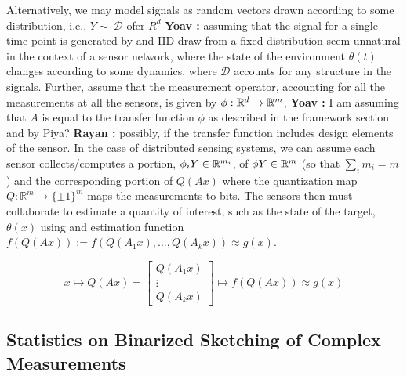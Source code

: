 \documentclass{article}
\newcommand{\comment}[3]{{\color{#1} {\bf #2 :} #3}}
\newcommand{\yoav}[1]{\comment{magenta}{Yoav}{#1}}
\newcommand{\rayan}[1]{\comment{red}{Rayan}{#1}}
\begin{document}
Alternatively, we may model signals as random vectors drawn according
to some distribution, i.e., $Y\sim~\mathcal{D}$ ofer $R^d$
\yoav{assuming that the signal for a single time point is generated by
  and IID draw from a fixed distribution seem unnatural in the context
  of a sensor network, where the state of the environment $\theta(t)$
  changes according to some dynamics.} where $\mathcal{D}$ accounts
for any structure in the signals. Further, assume that the measurement
operator, accounting for all the measurements at all the sensors, is
given by $\phi:\mathbb{R}^d \to \mathbb{R}^m$, \yoav{I am
  assuming that $A$ is equal to the transfer function $\phi$ as described in
  the framework section and by Piya?} \rayan{possibly, if the transfer function includes design elements of the sensor}. In
the case of distributed sensing systems, we can assume each sensor
collects/computes a portion, $\phi_i Y \in \mathbb{R}^{m_i}$, of
$\phi Y \in \mathbb{R}^m$ (so that $\sum_i{m_i}=m$) and the corresponding portion
of ${Q}(Ax)$ where the quantization map $Q: \mathbb{R}^m \to \{\pm
1\}^m $ maps the measurements to bits. The sensors then must
collaborate to estimate a  quantity of interest,
such as the state of the target, 
$\theta(x)$ using and estimation function $f(Q(Ax)):=f\left(Q(A_1x),...,Q(A_kx)\right)\approx g(x)$.

\begin{equation}\label{eq:binaryembedding}
x 
\mapsto Q(Ax) =\left[ \begin{array}{c} Q(A_1 x) \\ \vdots \\ Q(A_k x) \end{array}\right] \mapsto f(Q(Ax))\approx g(x)
\end{equation}




\subsection{Statistics on Binarized Sketching of Complex Measurements}
\end{document}
